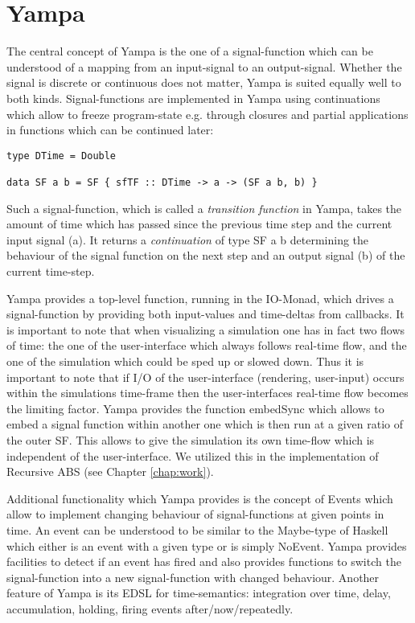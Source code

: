 \section{Yampa}
The central concept of Yampa is the one of a signal-function which can be understood of a mapping from an input-signal to an output-signal. Whether the signal is discrete or continuous does not matter, Yampa is suited equally well to both kinds. Signal-functions are implemented in Yampa using continuations which allow to freeze program-state e.g. through closures and partial applications in functions which can be continued later:
\begin{lstlisting}[]
type DTime = Double

data SF a b = SF { sfTF :: DTime -> a -> (SF a b, b) }
\end{lstlisting}
Such a signal-function, which is called a \textit{transition function} in Yampa, takes the amount of time which has passed since the previous time step and the current input signal (a). It returns a \textit{continuation} of type SF a b determining the behaviour of the signal function on the next step and an output signal (b) of the current time-step. 

Yampa provides a top-level function, running in the IO-Monad, which drives a signal-function by providing both input-values and time-deltas from callbacks. It is important to note that when visualizing a simulation one has in fact two flows of time: the one of the user-interface which always follows real-time flow, and the one of the simulation which could be sped up or slowed down. Thus it is important to note that if I/O of the user-interface (rendering, user-input) occurs within the simulations time-frame then the user-interfaces real-time flow becomes the limiting factor. Yampa provides the function embedSync which allows to embed a signal function within another one which is then run at a given ratio of the outer SF. This allows to give the simulation its own time-flow which is independent of the user-interface. We utilized this in the implementation of Recursive ABS (see Chapter \ref{chap:work}).

Additional functionality which Yampa provides is the concept of Events which allow to implement changing behaviour of signal-functions at given points in time. An event can be understood to be similar to the Maybe-type of Haskell which either is an event with a given type or is simply NoEvent. Yampa provides facilities to detect if an event has fired and also provides functions to switch the signal-function into a new signal-function with changed behaviour. Another feature of Yampa is its EDSL for time-semantics: integration over time, delay, accumulation, holding, firing events after/now/repeatedly.

